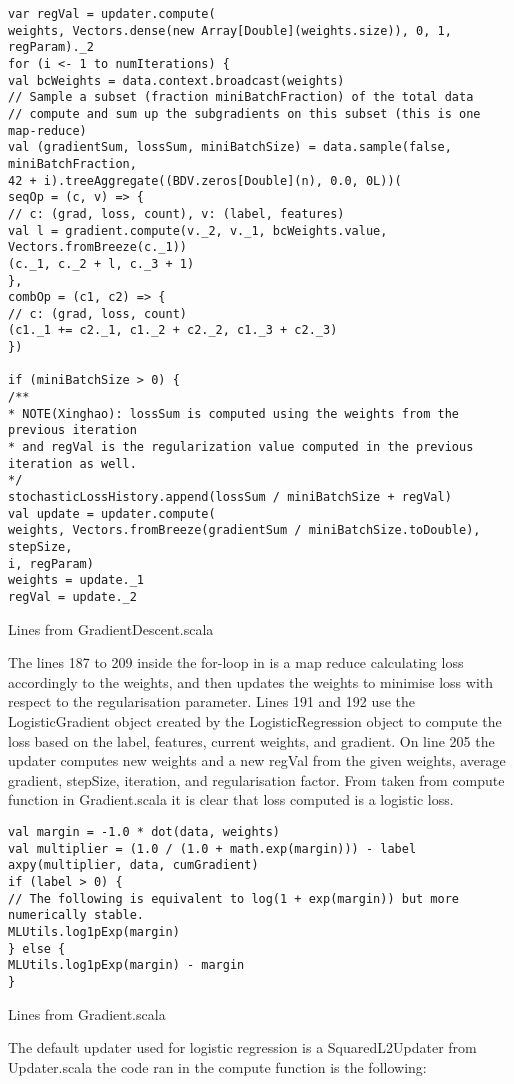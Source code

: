 \begin{listing}[H]
\begin{verbatim}
var regVal = updater.compute(
weights, Vectors.dense(new Array[Double](weights.size)), 0, 1, regParam)._2
for (i <- 1 to numIterations) {
val bcWeights = data.context.broadcast(weights)
// Sample a subset (fraction miniBatchFraction) of the total data
// compute and sum up the subgradients on this subset (this is one map-reduce)
val (gradientSum, lossSum, miniBatchSize) = data.sample(false, miniBatchFraction,
42 + i).treeAggregate((BDV.zeros[Double](n), 0.0, 0L))(
seqOp = (c, v) => {
// c: (grad, loss, count), v: (label, features)
val l = gradient.compute(v._2, v._1, bcWeights.value, Vectors.fromBreeze(c._1))
(c._1, c._2 + l, c._3 + 1)
},
combOp = (c1, c2) => {
// c: (grad, loss, count)
(c1._1 += c2._1, c1._2 + c2._2, c1._3 + c2._3)
})

if (miniBatchSize > 0) {
/**
* NOTE(Xinghao): lossSum is computed using the weights from the previous iteration
* and regVal is the regularization value computed in the previous iteration as well.
*/
stochasticLossHistory.append(lossSum / miniBatchSize + regVal)
val update = updater.compute(
weights, Vectors.fromBreeze(gradientSum / miniBatchSize.toDouble), stepSize,
i, regParam)
weights = update._1
regVal = update._2
\end{verbatim}
\caption{Lines from GradientDescent.scala}
\label{lst:runMiniBatchSGD}
\end{listing}
The lines 187 to 209 inside the for-loop in  is a map reduce calculating loss accordingly to the weights, and then updates the weights to minimise loss with respect to the regularisation parameter. Lines 191 and 192 use the LogisticGradient object created by the LogisticRegression object to compute the loss based on the label, features, current weights, and gradient. On line 205 the updater computes new weights and a new regVal from the given weights, average gradient, stepSize, iteration, and regularisation factor.
From  taken from compute function in Gradient.scala it is clear that loss computed is a logistic loss.  
\begin{listing}[H]
\begin{verbatim}
val margin = -1.0 * dot(data, weights)
val multiplier = (1.0 / (1.0 + math.exp(margin))) - label
axpy(multiplier, data, cumGradient)
if (label > 0) {
// The following is equivalent to log(1 + exp(margin)) but more numerically stable.
MLUtils.log1pExp(margin)
} else {
MLUtils.log1pExp(margin) - margin
}
\end{verbatim}
\caption{Lines from Gradient.scala}
\label{lst:sparkloss}
\end{listing}
The default updater used for logistic regression is a SquaredL2Updater from Updater.scala
the code ran in the compute function is the following:

